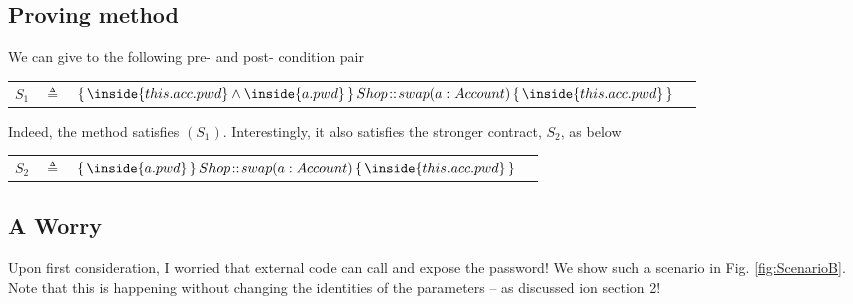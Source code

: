  
\subsection{Proving method }

We can give to    the following pre- and post- condition pair

\begin{tabular}{lcll}
 $S_{1}$   & $ \triangleq$ &
					 ${\mprepostLong 
					 {\inside {this.acc.pwd} \wedge \inside{a.pwd}}
					 {Shop}
					 {swap}
					 {a:Account}
					{\inside {this.acc.pwd}}
					}$
\end{tabular}
	
Indeed, the method  satisfies $(S_1)$.
Interestingly, it also satisfies the stronger contract, $S_2$, as below

\begin{tabular}{lcll}
 $S_{2}$   & $ \triangleq$  &
					$ {\mprepostLong 
					 {\inside{a.pwd}}
					 {Shop}
					 {swap}
					 {a:Account}
					{\inside {this.acc.pwd}}
					}$
\end{tabular}


\subsection{A Worry}

Upon first consideration, I worried that external code can call  and expose the password! We show such a scenario in Fig. \ref{fig:ScenarioB}. 
Note that this is happening without changing the identities of the parameters -- as discussed ion section 2!

